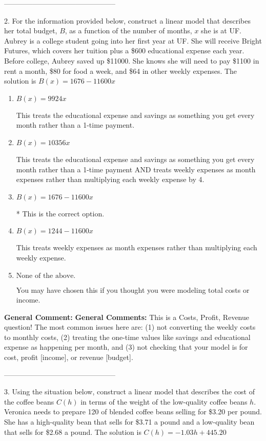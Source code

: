 \documentclass{extbook}[14pt]
\begin{document}
-----------------------------------------------

2. For the information provided below, construct a linear model that describes her total budget, $B$, as a function of the number of months, $x$ she is at UF.
Aubrey is a college student going into her first year at UF. She will receive Bright Futures, which covers her tuition plus a \$600 educational expense each year. Before college, Aubrey saved up \$11000. She knows she will need to pay \$1100 in rent a month, \$80 for food a week, and \$64 in other weekly expenses. 
The solution is $ B(x) = 1676 - 11600 x $ 

\begin{enumerate}[label=\Alph*.] 
\item $ B(x) = 9924 x $ 

 This treats the educational expense and savings as something you get every month rather than a 1-time payment. 
\item $ B(x) = 10356 x $ 

 This treats the educational expense and savings as something you get every month rather than a 1-time payment AND treats weekly expenses as month expenses rather than multiplying each weekly expense by 4. 
\item $ B(x) = 1676 - 11600 x $ 

 * This is the correct option. 
\item $ B(x) = 1244 - 11600 x $ 

 This treats weekly expenses as month expenses rather than multiplying each weekly expense. 
\item $ \text{None of the above.} $ 

 You may have chosen this if you thought you were modeling total costs or income. 
\end{enumerate} 
 
\textbf{General Comment:} \textbf{General Comments:} This is a Costs, Profit, Revenue question! The most common issues here are: (1) not converting the weekly costs to monthly costs, (2) treating the one-time values like savings and educational expense as happening per month, and (3) not checking that your model is for cost, profit [income], or revenue [budget]. 

-----------------------------------------------

3. Using the situation below, construct a linear model that describes the cost of the coffee beans $C(h)$ in terms of the weight of the low-quality coffee beans $h$.
Veronica needs to prepare 120 of blended coffee beans selling for \$3.20 per pound. She has a high-quality bean that sells for \$3.71 a pound and a low-quality bean that sells for \$2.68 a pound. 
The solution is $ C(h) = -1.03 h + 445.20 $ 
\end{document}
